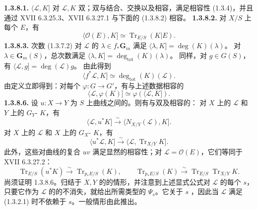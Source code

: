 \textbf{1.3.8.1.} $\langle\mathscr L,K]$ 对 $\mathscr L,K$ 双；双与结合、交换以及相容，满足相容性 (1.3.4)，并且通过 XVII 6.3.25.3、XVII 6.3.27.1 与下面的 (1.3.8.2) 相容。
\textbf{1.3.8.2.} 对 $X/S$ 上每个 $E$，有
\[\langle\mathscr O(E),K]\simeq\operatorname{Tr}_{E/S}(K|E).\]
\textbf{1.3.8.3.} 次数 (1.3.7.2) 对 $\mathscr L$ 的 $\lambda\in f_*\mathbf G_m$ 满足 $\langle\lambda,K]=\deg(K)(\lambda)$。
对 $\lambda\in\mathbf G_m(S)$，总次数满足 $\langle\lambda,K]=\deg_{\mathrm{tot}}(K)(\lambda)$。
同样，对 $g\in G(S)$，有 $\langle\mathscr L,g]=\deg(\mathscr L)g$。
由此得到
\begin{equation}\langle f^*\mathscr L,K]\simeq\deg_{\mathrm{tot}}(K)(\mathscr L).\tag{1.3.8.4}\end{equation}
由定义立即得到：对每个 $\varphi:G\to G'$，有与上述数据相容的
\begin{equation}\langle\mathscr L,\varphi(K)]\simeq\varphi(\langle\mathscr L,K]).\tag{1.3.8.5}\end{equation}
\textbf{1.3.8.6.} 设 $u:X\to Y$ 为 $S$ 上曲线之间的。则有与双及相容的：
对 $X$ 上的 $\mathscr L$ 和 $Y$ 上的 $G_Y$- $K$，有
\[\langle\mathscr L,u^*K]\xrightarrow\sim\langle N_{X/Y}(\mathscr L),K].\]
对 $X$ 上的 $\mathscr L$ 和 $X$ 上的 $G_X$- $K$，有
\[\langle u^*\mathscr L,K]\xrightarrow\sim\langle\mathscr L,\operatorname{Tr}_{X/Y}K].\]
此外，这些对曲线的复合 $uv$ 满足显然的相容性；对 $\mathscr L=\mathscr O(E)$，它们等同于 XVII 6.3.27.2：
\[\operatorname{Tr}_{E/S}(u^*K)\xrightarrow\sim\operatorname{Tr}_{p_*E/S}(K),\qquad\operatorname{Tr}_{p_*E/S}(K)\xrightarrow\sim\operatorname{Tr}_{E/S}\operatorname{Tr}_{X/Y}K.\]
尚须证明 1.3.8.6。归结于 $X,Y$ 的的情形，并注意到上述显式公式对 $\mathscr L$ 的每个 $s$，只要它作为 $\mathscr L$ 的的不消失，就给出所需类型的 $\Psi_s$。它关于 $s$ ，因此当 $\mathscr L$ 满足 (1.3.2.1) 时不依赖于 $s$。一般情形由此推出。
